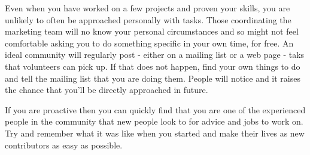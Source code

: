Even when you have worked on a few projects and proven your skills, you are unlikely to often be approached personally with tasks. Those coordinating the marketing team will no know your personal circumstances and so might not feel comfortable asking you to do something specific in your own time, for free. An ideal community will regularly post - either on a mailing list or a web page - taks that volunteers can pick up. If that does not happen, find your own things to do and tell the mailing list that you are doing them. People will notice and it raises the chance that you'll be directly approached in future.

If you are proactive then you can quickly find that you are one of the experienced people in the community that new people look to for advice and jobs to work on. Try and remember what it was like when you started and make their lives as new contributors as easy as possible.